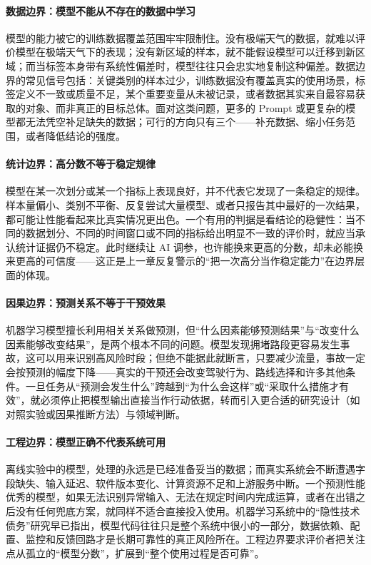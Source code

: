 \paragraph{数据边界：模型不能从不存在的数据中学习}
模型的能力被它的训练数据覆盖范围牢牢限制住。没有极端天气的数据，就难以评价模型在极端天气下的表现；没有新区域的样本，就不能假设模型可以迁移到新区域；而当标签本身带有系统性偏差时，模型往往只会忠实地复制这种偏差。数据边界的常见信号包括：关键类别的样本过少，训练数据没有覆盖真实的使用场景，标签定义不一致或质量不足，某个重要变量从未被记录，或者数据其实来自最容易获取的对象、而非真正的目标总体\cite{sambasivan2021data}。面对这类问题，更多的 Prompt 或更复杂的模型都无法凭空补足缺失的数据；可行的方向只有三个——补充数据、缩小任务范围，或者降低结论的强度。

\paragraph{统计边界：高分数不等于稳定规律}
模型在某一次划分或某一个指标上表现良好，并不代表它发现了一条稳定的规律。样本量偏小、类别不平衡、反复尝试大量模型、或者只报告其中最好的一次结果，都可能让性能看起来比真实情况更出色。一个有用的判据是看结论的稳健性：当不同的数据划分、不同的时间窗口或不同的指标给出明显不一致的评价时，就应当承认统计证据仍不稳定。此时继续让 AI 调参，也许能换来更高的分数，却未必能换来更高的可信度——这正是上一章反复警示的“把一次高分当作稳定能力”在边界层面的体现。

\paragraph{因果边界：预测关系不等于干预效果}
机器学习模型擅长利用相关关系做预测，但“什么因素能够预测结果”与“改变什么因素能够改变结果”，是两个根本不同的问题\cite{hernan2020causal}。模型发现拥堵路段更容易发生事故，这可以用来识别高风险时段；但绝不能据此就断言，只要减少流量，事故一定会按预测的幅度下降——真实的干预还会改变驾驶行为、路线选择和许多其他条件。一旦任务从“预测会发生什么”跨越到“为什么会这样”或“采取什么措施才有效”，就必须停止把模型输出直接当作行动依据，转而引入更合适的研究设计（如对照实验或因果推断方法）与领域判断。

\paragraph{工程边界：模型正确不代表系统可用}
离线实验中的模型，处理的永远是已经准备妥当的数据；而真实系统会不断遭遇字段缺失、输入延迟、软件版本变化、计算资源不足和上游服务中断。一个预测性能优秀的模型，如果无法识别异常输入、无法在规定时间内完成运算，或者在出错之后没有任何兜底方案，就同样不适合直接投入使用。机器学习系统中的“隐性技术债务”研究早已指出，模型代码往往只是整个系统中很小的一部分，数据依赖、配置、监控和反馈回路才是长期可靠性的真正风险所在\cite{sculley2015hidden}。工程边界要求评价者把关注点从孤立的“模型分数”，扩展到“整个使用过程是否可靠”。

